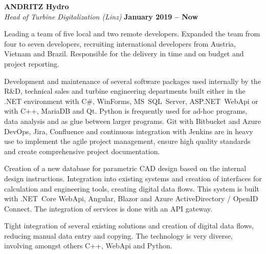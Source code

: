 \documentclass[line,11pt,a4paper]{../resume}
\begin{document}
\begin{resume}
\textbf{ANDRITZ Hydro}\\\vspace{1mm}%
\textsl{Head of Turbine Digitalization (Linz)} \hfill \textbf{January 2019 -- Now}\\
\vspace{-4mm}%
\begin{list2}
  \item Leading a team of five local and two remote developers. Expanded the
    team from four to seven developers, recruiting international developers
    from Austria, Vietnam and Brazil. Responsible for the delivery in time and
    on budget and project reporting.
  \item Development and maintenance of several software packages used
    internally by the R\&D, technical sales and turbine engineering
    departments built either in the .NET environment with C\#, WinForms,
    MS~SQL~Server, ASP.NET~WebApi or with C++, MariaDB and Qt. Python is
    frequently used for ad-hoc programs, data analysis and as glue between
    larger programs. Git with Bitbucket and Azure DevOps, Jira, Confluence and
    continuous integration with Jenkins are in heavy use to implement the agile
    project management, ensure high quality standards and create comprehensive
    project documentation.
  \item Creation of a new database for parametric CAD design based on the
    internal design instructions. Integration into existing systems and
    creation of interfaces for calculation and engineering tools, creating
    digital data flows. This system is built with .NET~Core WebApi, Angular,
    Blazor and Azure ActiveDirectory / OpenID Connect. The integration of
    services is done with an API gateway.
  \item Tight integration of several existing solutions and creation of digital
    data flows, reducing manual data entry and copying. The technology
    is very diverse, involving amongst others C++, WebApi and Python.
\end{list2}


\end{resume}
\end{document}
